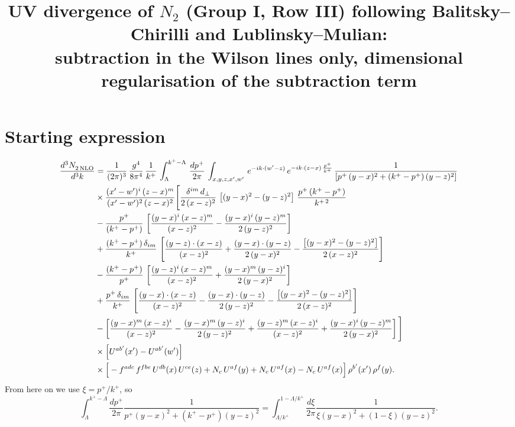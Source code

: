 \documentclass[10pt]{article}
\title{UV divergence of $N_{2}$ (Group I, Row III) following Balitsky--Chirilli and Lublinsky--Mulian:\\ subtraction in the Wilson lines only, dimensional regularisation of the subtraction term}
\date{}
\numberwithin{equation}{section}
\begin{document}
\maketitle

\section{Starting expression}
\begin{align}
    \frac{d^{3}N_{2\,\rm NLO}^{\rm}}{d^{3}k}  & =  \frac{1}{(2\pi)^{3}}\, \frac{g^{4}}{8\pi^{4}}\,\frac{1}{k^{+}}\,\int_{\Lambda}^{k^{+}-\Lambda}\, \frac{dp^{+}}{2\pi} \, \int_{x,y,z,x',w'}\,e^{-ik\cdot(w'-z)}\,e^{-ik\cdot (z-x)\,\frac{p^{+}}{k^{+}}}\,\frac{1}{\left[p^{+}\,(y-x)^{2}+(k^{+}-p^{+})\,(y-z)^{2}\right]}\notag \\ &\times \frac{(x'-w')^{i}\,(z-x)^{m}}{(x'-w')^{2}\,(z-x)^{2}}\Bigg[\frac{\delta^{im}\,d_{\perp}}{2\,(x-z)^{2}}\,\left[(y-x)^{2}-(y-z)^{2}\right]\,\frac{p^{+}\,(k^{+}-p^{+})}{k^{+\,2}}\notag\\ &-\frac{p^{+}}{(k^{+}-p^{+})}\,\left[\frac{(y-x)^{i}\,(x-z)^{m}}{(x-z)^{2}}-\frac{(y-x)^{i}\,(y-z)^{m}}{2\,(y-z)^{2}}\right]\notag \\ & +\frac{(k^{+}-p^{+})\,\delta_{im}}{k^{+}}\,\left[\frac{(y-z)\cdot (x-z)}{(x-z)^{2}}+\frac{(y-x)\cdot (y-z)}{2\,(y-x)^{2}}-\frac{\left[(y-x)^{2}-(y-z)^{2}\right]}{2\,(x-z)^{2}}\right]\notag \\ & -\frac{(k^{+}-p^{+})}{p^{+}}\,\left[\frac{(y-z)^{i}\,(x-z)^{m}}{(x-z)^{2}}+\frac{(y-x)^{m}\,(y-z)^{i}}{2\,(y-x)^{2}}\right]\notag \\ & +\frac{p^{+}\,\delta_{im}}{k^{+}}\,\left[\frac{(y-x)\cdot (x-z)}{(x-z)^{2}}-\frac{(y-x)\cdot (y-z)}{2\,(y-z)^{2}}-\frac{\left[(y-x)^{2}-(y-z)^{2}\right]}{2\,(x-z)^{2}}\right]\notag \\ &-\left[\frac{(y-x)^{m}\,(x-z)^{i}}{(x-z)^{2}}-\frac{(y-x)^{m}\,(y-z)^{i}}{2\,(y-z)^{2}}+\frac{(y-z)^{m}\,(x-z)^{i}}{(x-z)^{2}}+\frac{(y-x)^{i}\,(y-z)^{m}}{2\,(y-x)^{2}}\right]\Bigg]\notag \\ & \times\Big[U^{ab'}(x')-U^{ab'}(w')\Big]\notag\\&\times\Big[-f^{adc}\,f^{fbe}\,U^{db}(x)\,U^{ce}(z)+N_{c}\,U^{af}(y)+N_{c}\,U^{af}(x) -N_{c}\,U^{af}(x)\Big]\,\rho^{b'}(x')\,\rho^{f}(y).
\label{eq:N2}
\end{align}
From here on we use $\xi=p^{+}/k^{+}$, so
\[\int_{\Lambda}^{k^{+}-\Lambda}\frac{dp^{+}}{2\pi}\frac{1}{p^{+}(y-x)^{2}+(k^{+}-p^{+})(y-z)^{2}}=\int_{\Lambda/k^{+}}^{1-\Lambda/k^{+}}\frac{d\xi}{2\pi}\frac{1}{\xi(y-x)^{2}+(1-\xi)(y-z)^{2}}.\]
\end{document}
